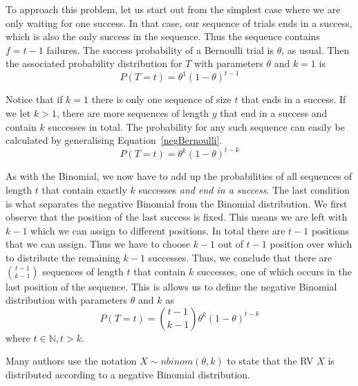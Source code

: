 To approach this problem, let us start out from the simplest case where we are only waiting for one success. In that case, our sequence of trials ends in a success,
which is also the only success in the sequence. Thus the sequence contains $ f = t-1 $ failures. The success probability of a Bernoulli trial is $ \theta $, as usual.
Then the associated probability distribution for $ T $ with parameters $ \theta $ and $ k=1 $ is
\begin{equation} \label{negBernoulli}
P(T=t) = \theta^{1} (1-\theta)^{t-1}
\end{equation}

Notice that if $ k=1 $ there is only one sequence of size $ t $ that ends in a success. If we let $ k>1 $, there are more sequences of length $ y $ that end in a success 
and contain $ k $ successes in total. The probability for any such sequence can easily be calculated by generalising Equation~\eqref{negBernoulli}.
\begin{equation}
P(T=t) = \theta^{k} (1-\theta)^{t-k}
\end{equation}

As with the Binomial, we now have to add up the probabilities of all sequences of length $ t $ that contain exactly $ k $ successes \textit{and end in a success}. The
last condition is what separates the negative Binomial from the Binomial distribution. We first observe that the position of the last success is fixed. This means
we are left with $ k-1 $ which we can assign to different positions. In total there are $ t-1 $ positions that we can assign. Thus we have to choose $ k-1 $ out
of $ t-1 $ position over which to distribute the remaining $ k-1 $ successes. Thus, we conclude that there are $ \binom{t-1}{k-1} $ sequences of length $ t $ that
contain $ k $ successes, one of which occurs in the last position of the sequence. This is allows us to define the negative Binomial distribution with parameters 
$ \theta $ and $ k $ as
\begin{equation}
P(T=t) = \binom{t-1}{k-1} \theta^{k} (1-\theta)^{t-k}
\end{equation}
where $ t \in \mathbb{N}, t > k $.

Many authors use the notation $ X \sim nbinom(\theta, k) $ to state that the RV $ X $ is distributed according to a negative Binomial distribution.



